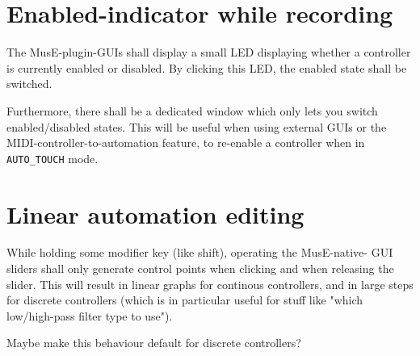 \documentclass[a4paper]{report}
\newcommand{\sym}[1]{\texttt{#1}}
\begin{document}
\section{Enabled-indicator while recording}
The MusE-plugin-GUIs shall display a small LED displaying whether a
controller is currently enabled or disabled. By clicking this LED, the
enabled state shall be switched.

Furthermore, there shall be a dedicated window which only lets you switch
enabled/disabled states. This will be useful when using external GUIs
or the MIDI-controller-to-automation feature, to re-enable a controller
when in \sym{AUTO\_TOUCH} mode.



\section{Linear automation editing}
While holding some modifier key (like shift), operating the MusE-native-
GUI sliders shall only generate control points when clicking and when
releasing the slider. This will result in linear graphs for continous
controllers, and in large steps for discrete controllers (which is in
particular useful for stuff like "which low/high-pass filter type to use").

Maybe make this behaviour default for discrete controllers?
\end{document}

